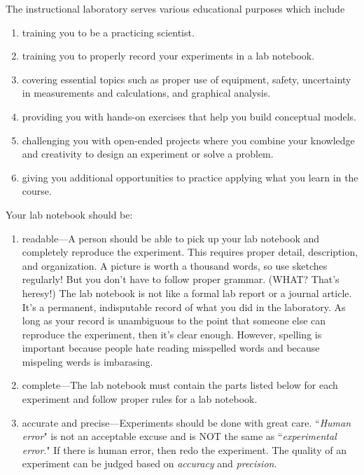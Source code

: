 
\bigskip
\noindent
The instructional laboratory serves various educational purposes which include

\begin{enumerate}
	\item training you to be a practicing scientist.
	\item training you to properly record your experiments in a lab notebook.
	\item covering essential topics such as proper use of equipment, safety, uncertainty in measurements and calculations, and graphical analysis.
	\item providing you with hands-on exercises that help you build conceptual models.
	\item challenging you with open-ended projects where you combine your knowledge and creativity to design an experiment or solve a problem.
	\item giving you additional opportunities to practice applying what you learn in the course.
\end{enumerate}

Your lab notebook should be:

\begin{enumerate}
	\item readable---A person should be able to pick up your lab notebook and completely reproduce the experiment. This requires proper detail, description, and organization. A picture is worth a thousand words, so use sketches regularly! But you don't have to follow proper grammar. (WHAT? That's heresy!) The lab notebook is not like a formal lab report or a journal article. It's a permanent, indisputable record of what you did in the laboratory. As long as your record is unambiguous to the point that someone else can reproduce the experiment, then it's clear enough. However, spelling is important because people hate reading misspelled words and because mispeling werds is imbarasing.
	\item complete---The lab notebook must contain the parts listed below for each experiment and follow proper rules for a lab notebook.
	\item accurate and precise---Experiments should be done with great care. ``\emph{Human error}" is not an acceptable excuse and is NOT the same as ``\emph{experimental error}." If there is human error, then redo the experiment. The quality of an experiment can be judged based on \emph{accuracy} and \emph{precision}.
\end{enumerate}

